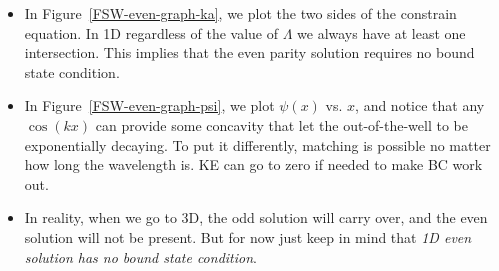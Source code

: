 \documentclass{school-22.101-notes}
\begin{document}
\begin{itemize}
\item In Figure~\ref{FSW-even-graph-ka}, we plot the two sides of the constrain equation. In 1D regardless of the value of $\Lambda$ we always have at least one intersection. This implies that the even parity solution requires no bound state condition. 

\item In Figure~\ref{FSW-even-graph-psi}, we plot $\psi(x)$ vs. $x$, and notice that any $\cos(kx)$ can provide some concavity that let the out-of-the-well to be exponentially decaying. To put it differently, matching is possible no matter how long the wavelength is. KE can go to zero if needed to make BC work out. 

\item In reality, when we go to 3D, the odd solution will carry over, and the even solution will not be present. But for now just keep in mind that \textit{1D even solution has no bound state condition}. 
\end{itemize}
\end{document}

